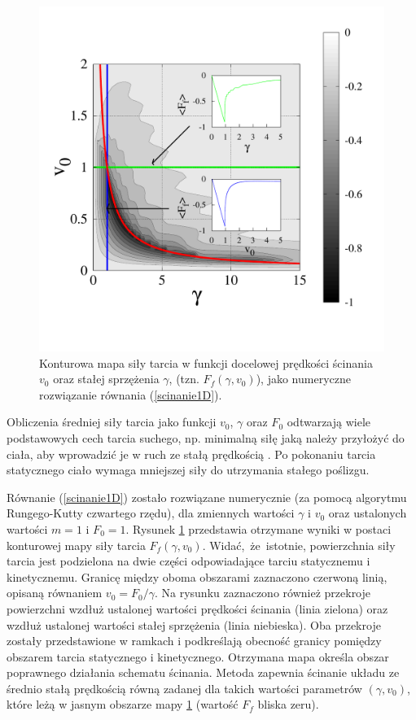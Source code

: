 \documentclass[12pt,a4paper,openright]{report} %
\begin{document}
\begin{figure}[h]
\centering
\includegraphics[width=120mm]{rysunki/tomlinson_wynik.pdf}
\caption{Konturowa mapa siły tarcia w funkcji docelowej prędkości ścinania $v_0$ oraz stałej sprzężenia $\gamma$, (tzn. $F_f(\gamma, v_0)$), jako numeryczne rozwiązanie równania (\ref{scinanie1D}).}
\label{tomlinson_wynik}
\end{figure}
Obliczenia średniej siły tarcia jako funkcji $v_0$, $\gamma$ oraz $F_0$ odtwarzają wiele podstawowych cech tarcia suchego, np. minimalną siłę jaką należy przyłożyć do ciała, aby wprowadzić je w ruch ze stałą prędkością \cite{Popov2014, Muser2003}. Po pokonaniu tarcia statycznego ciało wymaga mniejszej siły do utrzymania stałego poślizgu. 

Równanie (\ref{scinanie1D}) zostało rozwiązane numerycznie (za pomocą algorytmu Rungego-Kutty czwartego rzędu), dla zmiennych wartości $\gamma$ i $v_0$ oraz ustalonych wartości $m=1$ i $F_0=1$. Rysunek \ref{tomlinson_wynik} przedstawia otrzymane wyniki w postaci konturowej mapy siły tarcia $F_f(\gamma, v_0)$. Widać,~że~istotnie, powierzchnia siły tarcia jest podzielona na dwie części odpowiadające tarciu statycznemu i kinetycznemu. Granicę między oboma obszarami zaznaczono czerwoną linią, opisaną równaniem $v_0=F_0 / \gamma$. Na rysunku zaznaczono również przekroje powierzchni wzdłuż ustalonej wartości prędkości ścinania (linia zielona) oraz wzdłuż ustalonej wartości stałej sprzężenia (linia niebieska). Oba przekroje zostały przedstawione w ramkach i podkreślają obecność granicy pomiędzy obszarem tarcia statycznego i kinetycznego. Otrzymana mapa określa obszar poprawnego działania schematu ścinania. Metoda zapewnia ścinanie układu ze średnio stałą prędkością równą zadanej dla takich wartości parametrów $(\gamma, v_0)$, które leżą w jasnym obszarze mapy \ref{tomlinson_wynik} (wartość $F_f$ bliska zeru).
\end{document}
